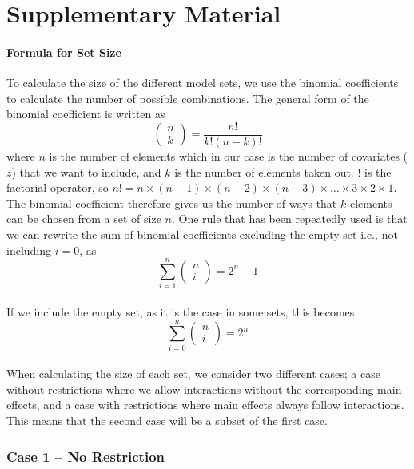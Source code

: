 \part*{Supplementary Material} 

\setcounter{table}{0}
\setcounter{figure}{0}
\renewcommand{\thetable}{S\arabic{table}}
\renewcommand{\thefigure}{S\arabic{figure}}

\subsection{Formula for Set Size}
To calculate the size of the different model sets, we use the binomial coefficients to calculate the number of possible combinations. The general form of the binomial coefficient is written as
\[\left( \begin{array}{c}
n \\ 
k \end{array}
\right)=\frac{n!}{k!\left(n-k\right)!}\] 
where $n$ is the number of elements which in our case is the number of covariates ($z$) that we want to include, and $k$ is the number of elements taken out. $!$ is the factorial operator, so $n!=n\times \left(n-1\right)\times \left(n-2\right)\times \left(n-3\right)\times \dots \times 3\times 2\times 1$. The binomial coefficient therefore gives us the number of ways that $k$ elements can be chosen from a set of size $n$. One rule that has been repeatedly used is that we can rewrite the sum of binomial coefficients excluding the empty set i.e., not including $i=0$, as 
\[\sum^n_{i=1}{\left( \begin{array}{c}
n \\ 
i \end{array}
\right)}=2^n-1\] 
\\
If we include the empty set, as it is the case in some sets, this becomes
\[\sum^n_{i=0}{\left( \begin{array}{c}
n \\ 
i \end{array}
\right)}=2^n\] 
\\
When calculating the size of each set, we consider two different cases; a case without restrictions where we allow interactions without the corresponding main effects, and a case with restrictions where main effects always follow interactions. This means that the second case will be a subset of the first case. \\

\section{Case 1 – No Restriction}
